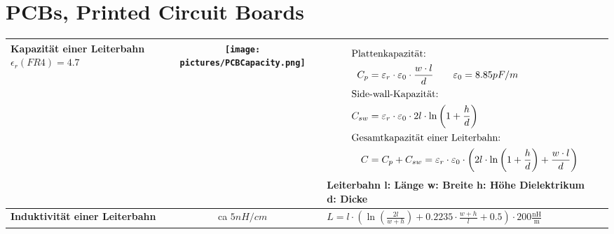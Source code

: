 \section{PCBs, Printed Circuit Boards}

\begin{longtable}{|>{\bfseries}p{3cm}|c|p{11.2cm}|}
    \hline
    Kapazität \newline einer Leiterbahn\newline $\epsilon_r(FR4) = 4.7$
    & \texttt{[image: pictures/PCBCapacity.png]}
    & {\vspace{-1.8\topsep}
        \begin{align*}
            \intertext{Plattenkapazität:}
            C_p &= \varepsilon_{r}\cdot \varepsilon_{0}\cdot \frac{w\cdot l}{d} \qquad \varepsilon_{0}= 8.85 pF/m\\
            \intertext{Side-wall-Kapazität:}
            C_{sw} &= \varepsilon_{r}\cdot \varepsilon_{0}\cdot 2l \cdot \ln\left( 1 + \frac{h}{d}\right) \\
            \intertext{Gesamtkapazität einer Leiterbahn:}
            C &= C_p + C_{sw} = \varepsilon_{r}\cdot \varepsilon_{0}\cdot \left( 2l \cdot \ln\left( 1 + \frac{h}{d}\right) + \frac{w\cdot l}{d}\right) 
        \end{align*}
        \newline
        Leiterbahn \qquad l: Länge \qquad w: Breite \qquad h: Höhe\newline
        Dielektrikum $\;\;$ d: Dicke
    }
    \\ \hline
    Induktivität \newline einer Leiterbahn
    & ca $5nH / cm$
    & {\newline
       $L = l \cdot\left( \ln\left( \frac{2l}{w + h}\right)  + 0.2235 \cdot \frac{w + h}{l} + 0.5\right)  \cdot 200\frac{\mathrm{nH}}{\mathrm{m}}$
       \newline 
      }
    \\ \hline
\end{longtable}